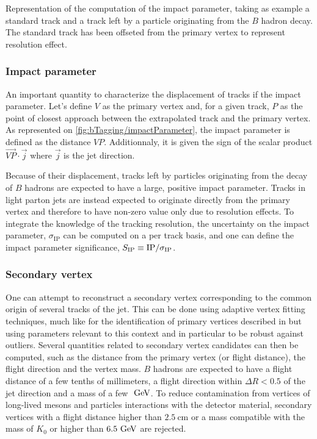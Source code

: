                  {Representation of the computation of the impact parameter, taking as
                 example a standard track and a track left by a particle originating from
                 the $B$ hadron decay. The standard track has been offseted from the primary
                 vertex to represent resolution effect.}

    \subsubsection{Impact parameter}

    An important quantity to characterize the displacement of tracks if the impact parameter.
    Let's define $V$ as the primary vertex and, for a given track, $P$ as the point of
    closest approach between the extrapolated track and the primary vertex. As represented on
    \ref{fig:bTagging/impactParameter}, the impact parameter is defined as the distance
    $VP$. Additionnaly, it is given the sign of the scalar product $\vec{VP} \cdot \vec{j}$
    where $\vec{j}$ is the jet direction.

    Because of their displacement, tracks left by particles originating from the decay of
    $B$ hadrons are expected to have a large, positive impact parameter. Tracks in light
    parton jets are instead expected to originate directly from the primary vertex and
    therefore to have non-zero value only due to resolution effects. To integrate the
    knowledge of the tracking resolution, the uncertainty on the impact parameter,
    $\sigma_\text{IP}$ can be computed on a per track basis, and one can define the impact
    parameter significance, $S_\text{IP} \equiv \text{IP}/\sigma_\text{IP}$.


    \subsubsection{Secondary vertex}

    One can attempt to reconstruct a secondary vertex corresponding to the common origin
    of several tracks of the jet. This can be done using adaptive vertex fitting techniques,
    much like for the identification of primary vertices described in 
    but using parameters relevant to this context and in particular to be robust against
    outliers. Several quantities related to secondary vertex candidates can then be computed,
    such as the distance from the primary vertex (or flight distance), the flight direction
    and the vertex mass. $B$ hadrons are expected to have a flight distance of a few tenths
    of millimeters, a flight direction within $\Delta R < 0.5$ of the jet direction and a
    mass of a few $~\text{GeV}$. To reduce contamination from vertices of long-lived mesons and
    particles interactions with the detector material, secondary vertices with a flight
    distance higher than $2.5~\text{cm}$ or a mass compatible with the mass of $K_0$ or
    higher than $6.5~\text{GeV}$ are rejected.


